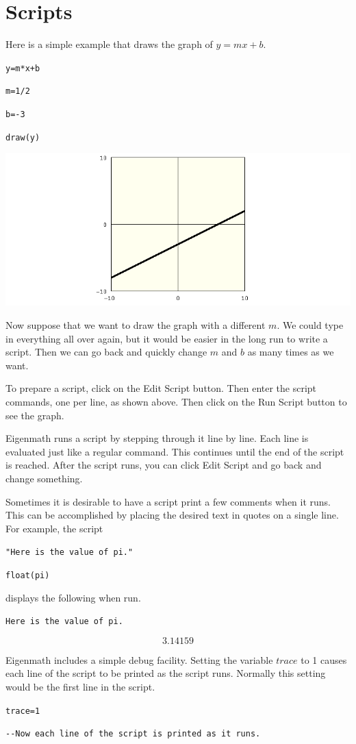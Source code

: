 \section{Scripts}
Here is a simple example that draws the graph of $y=mx+b$.

\medskip
\verb$y=m*x+b$

\verb$m=1/2$

\verb$b=-3$

\verb$draw(y)$

\begin{center}
\includegraphics[scale=0.4]{1.png}
\end{center}

\noindent
Now suppose that we want to draw the graph
with a different $m$.
We could type in everything all over again, but it would be easier
in the long run to write a script.
Then we can go back and quickly change $m$ and $b$ as many times as we want.

\medskip
\noindent
To prepare a script, click on the Edit Script button.
Then enter the script commands, one per line, as shown above.
Then click on the Run Script button to see the graph.

\medskip
\noindent
Eigenmath runs a script by stepping through it line by line.
Each line is evaluated just like a regular command.
This continues until the end of the script is reached.
After the script runs, you can click Edit Script and go back and change something.

\newpage

\noindent
Sometimes it is desirable to have a script print a few comments when it runs.
This can be accomplished by placing the desired text in quotes
on a single line.
For example, the script

\medskip
\verb$"Here is the value of pi."$

\verb$float(pi)$

\medskip
\noindent
displays the following when run.

\medskip
\verb$Here is the value of pi.$

$$3.14159$$

\medskip
\noindent
Eigenmath includes a simple debug facility.
Setting the variable $trace$ to 1 causes each line of the script to be
printed as the script runs.
Normally this setting would be the first line in the script.

\medskip
\verb$trace=1$

\verb$--Now each line of the script is printed as it runs.$

